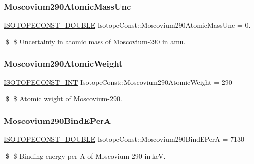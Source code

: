 \subsubsection{\texorpdfstring{Moscovium290\+Atomic\+Mass\+Unc}{Moscovium290AtomicMassUnc}}
{\footnotesize\ttfamily \mbox{\hyperlink{group___isotope_const-_macros_ga8f45a7272ce02c0b4c65c44636ed719a}{I\+S\+O\+T\+O\+P\+E\+C\+O\+N\+S\+T\+\_\+\+D\+O\+U\+B\+LE}} Isotope\+Const\+::\+Moscovium290\+Atomic\+Mass\+Unc = 0.}

\$ \$ Uncertainty in atomic mass of Moscovium-\/290 in amu. \mbox{\label{group___isotope_const-_moscovium-_mc290_gaed5f0cf160634c8df63068cdae33da94}} 
\subsubsection{\texorpdfstring{Moscovium290\+Atomic\+Weight}{Moscovium290AtomicWeight}}
{\footnotesize\ttfamily \mbox{\hyperlink{group___isotope_const-_macros_ga5f18360b3e99483a35c32d789e62621c}{I\+S\+O\+T\+O\+P\+E\+C\+O\+N\+S\+T\+\_\+\+I\+NT}} Isotope\+Const\+::\+Moscovium290\+Atomic\+Weight = 290}

\$ \$ Atomic weight of Moscovium-\/290. \mbox{\label{group___isotope_const-_moscovium-_mc290_gac3821b7bd0e9fa1b192f98ff71570dba}} 
\subsubsection{\texorpdfstring{Moscovium290\+Bind\+E\+PerA}{Moscovium290BindEPerA}}
{\footnotesize\ttfamily \mbox{\hyperlink{group___isotope_const-_macros_ga8f45a7272ce02c0b4c65c44636ed719a}{I\+S\+O\+T\+O\+P\+E\+C\+O\+N\+S\+T\+\_\+\+D\+O\+U\+B\+LE}} Isotope\+Const\+::\+Moscovium290\+Bind\+E\+PerA = 7130}

\$ \$ Binding energy per A of Moscovium-\/290 in keV. \mbox{\label{group___isotope_const-_moscovium-_mc290_gaf2cb9b2b7899740a6d5293a7e7ec717d}} 
